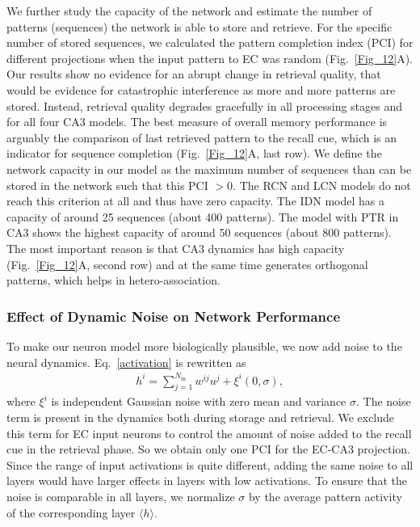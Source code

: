 \documentclass[utf8]{frontiersSCNS} %
\begin{document}
We further study the capacity of the network and estimate the number of patterns (sequences) the network is able to store and retrieve. For the specific number of stored sequences, we calculated the pattern completion index (PCI) for different projections when the input pattern to EC was random (Fig.~\ref{Fig_12}A). Our results show no evidence for an abrupt change in retrieval quality, that would be evidence for catastrophic interference as more and more patterns are stored. Instead, retrieval quality degrades gracefully in all processing stages and for all four CA3 models. The best measure of overall memory performance is arguably the comparison of last retrieved pattern to the recall cue, which is an indicator for sequence completion (Fig.~\ref{Fig_12}A, last row). We define the network capacity in our model as the maximum number of sequences than can be stored in the network such that this PCI $> 0$.
The RCN and LCN models do not reach this criterion at all and thus have zero capacity. The IDN model has a capacity of around 25 sequences (about 400 patterns). The model with PTR in CA3 shows the highest capacity of around 50 sequences (about 800 patterns). The most important reason is that CA3 dynamics has high capacity (Fig.~\ref{Fig_12}A, second row) and at the same time generates orthogonal patterns, which helps in hetero-association.  


\subsubsection*{Effect of Dynamic Noise on Network Performance}

To make our neuron model more biologically plausible, we now add noise to the neural dynamics. Eq.~\ref{activation} is rewritten as
\begin{align}
\label{dynamic-noise}
h^i = \sum_{j=1}^{N_\mathrm{in}} w^{ij}u^j + \xi ^i (0,\sigma),
\end{align}  
where $\xi^i$ is independent Gaussian noise with zero mean and variance $\sigma$. The noise term is present in the dynamics both during storage and retrieval. We exclude this term for EC input neurons to control the amount of noise added to the recall cue in the retrieval phase. So we obtain only one PCI for the EC-CA3 projection. Since the range of input activations is quite different, adding the same noise to all layers would have larger effects in layers with low activations. To ensure that the noise is comparable in all layers, we normalize $ \sigma $ by the average pattern activity of the corresponding layer $\langle h \rangle$. 
\end{document}
